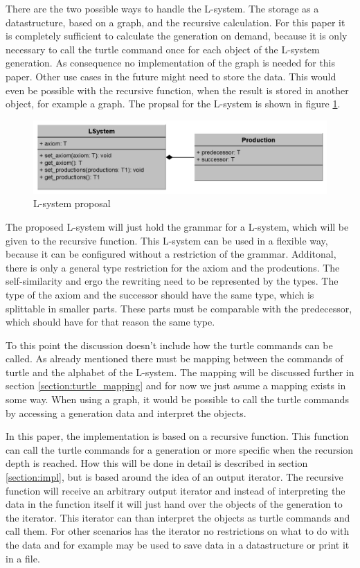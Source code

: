 \documentclass[english]{cpp-hmwk}
\begin{document}
\bigskip
 
\noindent There are the two possible ways to handle the L-system. The storage as a datastructure, based on a graph, and the recursive calculation. For this paper it is completely sufficient to calculate the generation on demand, because it is only necessary to call the turtle command once for each object of the L-system generation. As consequence no implementation of the graph is needed for this paper. Other use cases in the future might need to store the data. This would even be possible with the recursive function, when the result is stored in another object, for example a graph. The propsal for the L-system is shown in figure \ref{figure:lsystem_proposal}.

\begin{figure}[h!]
	\centering
	\includegraphics[width=1\columnwidth]{../graphs/LSystem/examples/l_system_proposal.png}
	\caption{L-system proposal}
	\label{figure:lsystem_proposal}
\end{figure}

\medskip
\noindent The proposed L-system will just hold the grammar for a L-system, which will be given to the recursive function. This L-system can be used in a flexible way, because it can be configured without a restriction of the grammar. Additonal, there is only a general type restriction for the axiom and the prodcutions. The self-similarity and ergo the rewriting need to be represented by the types. The type of the axiom and the successor should have the same type, which is splittable in smaller parts. These parts must be comparable with the predecessor, which should have for that reason the same type.

To this point the discussion doesn't include how the turtle commands can be called. As already mentioned there must be mapping between the commands of turtle and the alphabet of the L-system. The mapping will be discussed further in section \ref{section:turtle_mapping} and for now we just asume a mapping exists in some way. When using a graph, it would be possible to call the turtle commands by accessing a generation data and interpret the objects.

In this paper, the implementation is based on a recursive function. This function can call the turtle commands for a generation or more specific when the recursion depth is reached. How this will be done in detail is described in section \ref{section:impl}, but is based around the idea of an output iterator. The recursive function will receive an arbitrary output iterator and instead of interpreting the data in the function itself it will just hand over the objects of the generation to the iterator. This iterator can than interpret the objects as turtle commands and call them.  For other scenarios has the iterator no restrictions on what to do with the data and for example may be used to save data in a datastructure or print it in a file.
\end{document}
